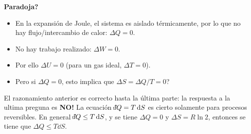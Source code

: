 {\Large \textbf{Paradoja?}} \\
\begin{itemize}
	\item En la expansión de Joule, el sistema es aislado térmicamente, por lo que no hay flujo/intercambio de calor: $\Delta Q = 0$.
	\item No hay trabajo realizado: $\Delta W = 0$.
	\item Por ello $\Delta U = 0$ (para un gas ideal, $\Delta T = 0$).
	\item Pero si $\Delta Q = 0$, esto implica que $\Delta S = \Delta Q/T = 0$?
\end{itemize}
 El razonamiento anterior es correcto hasta la última parte: la respuesta a la ultima preguna es \textbf{NO!} La ecuación $\dbar Q = T\dd{S}$ es cierto solamente para procesos reversibles. En general $\dbar Q \leq T\dd{S}$, y se tiene $\Delta Q = 0$ y $\Delta S = R \ln{2}$, entonces se tiene que $\Delta Q \leq T \dd{S}$.









































































